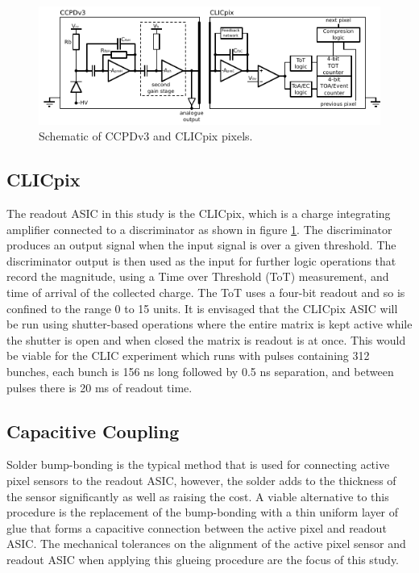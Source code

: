 \begin{figure}
\centering
\includegraphics[width=1.0\textwidth]{CLICdpVertex/Plots/schematic.pdf}
\caption[Schematic of CCPDv3 and CLICpix pixels.]{Schematic of CCPDv3 and CLICpix pixels.}
\label{fig:ccpdandclicpix}
\end{figure}


\subsection{CLICpix}
The readout ASIC in this study is the CLICpix, which is a charge integrating amplifier connected to a discriminator as shown in figure \ref{fig:ccpdandclicpix}.  The discriminator produces an output signal when the input signal is over a given threshold.  The discriminator output is then used as the input for further logic operations that record the magnitude, using a Time over Threshold (ToT) measurement, and time of arrival of the collected charge.  The ToT uses a four-bit readout and so is confined to the range 0 to 15 units.  It is envisaged that the CLICpix ASIC will be run using shutter-based operations where the entire matrix is kept active while the shutter is open and when closed the matrix is readout is at once.  This would be viable for the CLIC experiment which runs with pulses containing 312 bunches, each bunch is 156 ns long followed by 0.5 ns separation, and between pulses there is 20 ms of readout time.  


\subsection{Capacitive Coupling}
Solder bump-bonding is the typical method that is used for connecting active pixel sensors to the readout ASIC, however, the solder adds to the thickness of the sensor significantly as well as raising the cost.  A viable alternative to this procedure is the replacement of the bump-bonding with a thin uniform layer of glue that forms a capacitive connection between the active pixel and readout ASIC.  The mechanical tolerances on the alignment of the active pixel sensor and readout ASIC when applying this glueing procedure are the focus of this study.  

